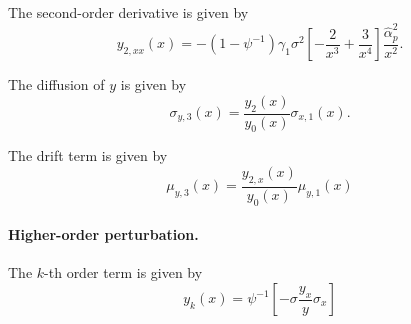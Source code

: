 \documentclass[11pt,english]{article}
\begin{document}
The second-order derivative is given by
\begin{equation}
    y_{2,xx}(x) = -(1-\psi^{-1}) \gamma_1 \sigma^2 \left[ -\frac{2}{x^3} +\frac{3}{x^4}\right] \frac{\hat{\alpha}_p^2}{x^2}.
\end{equation}

The diffusion of $y$ is given by 
\begin{equation}
    \sigma_{y,3}(x) = \frac{y_{2}(x)}{y_0(x)} \sigma_{x,1}(x).
\end{equation}

The drift term is given by
\begin{equation}
    \mu_{y,3}(x) = \frac{y_{2,x}(x)}{y_0(x)}\mu_{y,1}(x)
\end{equation}

\paragraph{Higher-order perturbation.}

The $k$-th order term is given by
\begin{equation}
    y_k(x) = \psi^{-1} \left[ -\sigma \frac{y_{x}}{y} \sigma_x \right]
\end{equation}


\newpage
\singlespacing
%
\clearpage

\end{document}
